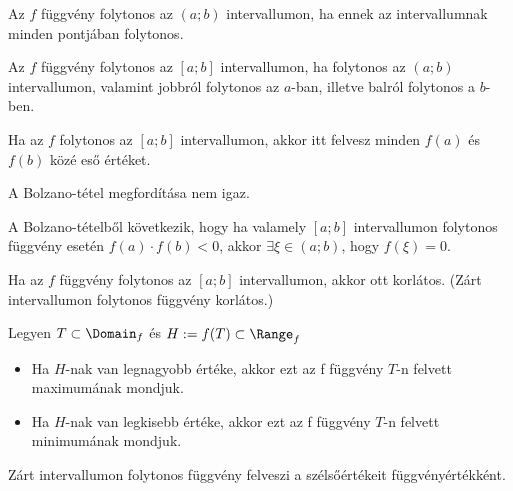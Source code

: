 \begin{definition}
  Az $f$ függvény folytonos az $(a; b)$ intervallumon, ha ennek az
  intervallumnak minden pontjában folytonos.
\end{definition}

\begin{definition}
  Az $f$ függvény folytonos az $[a; b]$ intervallumon, ha folytonos az $(a; b)$
  intervallumon, valamint jobbról folytonos az $a$-ban, illetve balról folytonos
  a $b$-ben.
\end{definition}

\begin{theorem}
  Ha az $f$ folytonos az $[a;b]$ intervallumon, akkor itt felvesz minden $f(a)$
  és $f(b)$ közé eső értéket.
\end{theorem}

\begin{note}
  A Bolzano-tétel megfordítása nem igaz.
\end{note}

\begin{note}
  A Bolzano-tételből következik, hogy ha valamely $[a; b]$ intervallumon
  folytonos függvény esetén $f(a) \cdot f(b) < 0$, akkor $\exists \xi \in
    (a;b)$, hogy $f(\xi) = 0$.
\end{note}

\begin{theorem}
  Ha az $f$ függvény folytonos az $[a; b]$ intervallumon, akkor ott korlátos.
  (Zárt intervallumon folytonos függvény korlátos.)
\end{theorem}

\begin{definition}
  Legyen $T \subset \Domain_f$ és $H := f(T) \subset \Range_f$
  \begin{itemize}
    \item Ha $H$-nak van legnagyobb értéke, akkor ezt az f függvény $T$-n
          felvett maximumának mondjuk.

    \item Ha $H$-nak van legkisebb értéke, akkor ezt az f függvény $T$-n felvett
          minimumának mondjuk.
  \end{itemize}
\end{definition}

\begin{theorem}
  Zárt intervallumon folytonos függvény felveszi a szélsőértékeit
  függvényértékként.
\end{theorem}

